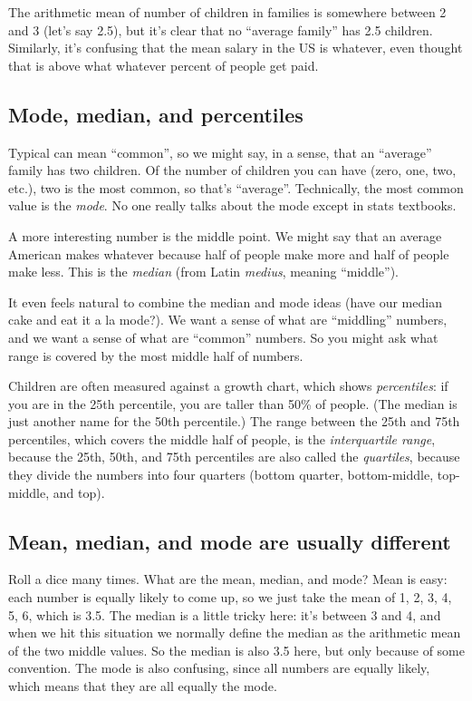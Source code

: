 The arithmetic mean of number of children in families is somewhere
between 2 and 3 (let's say 2.5), but it's clear that no ``average
family'' has 2.5 children. Similarly, it's confusing that the mean
salary in the US is whatever, even thought that is above what whatever
percent of people get paid.

\subsection{Mode, median, and
percentiles}\label{mode-median-and-percentiles}

Typical can mean ``common'', so we might say, in a sense, that an
``average'' family has two children. Of the number of children you can
have (zero, one, two, etc.), two is the most common, so that's
``average''. Technically, the most common value is the \emph{mode}. No
one really talks about the mode except in stats textbooks.

A more interesting number is the middle point. We might say that an
average American makes whatever because half of people make more and
half of people make less. This is the \emph{median} (from Latin
\emph{medius}, meaning ``middle'').

It even feels natural to combine the median and mode ideas (have our
median cake and eat it a la mode?). We want a sense of what are
``middling'' numbers, and we want a sense of what are ``common''
numbers. So you might ask what range is covered by the most middle half
of numbers.

Children are often measured against a growth chart, which shows
\emph{percentiles}: if you are in the 25th percentile, you are taller
than 50\% of people. (The median is just another name for the 50th
percentile.) The range between the 25th and 75th percentiles, which
covers the middle half of people, is the \emph{interquartile range},
because the 25th, 50th, and 75th percentiles are also called the
\emph{quartiles}, because they divide the numbers into four quarters
(bottom quarter, bottom-middle, top-middle, and top).

\subsection{Mean, median, and mode are usually
different}\label{mean-median-and-mode-are-usually-different}

Roll a dice many times. What are the mean, median, and mode? Mean is
easy: each number is equally likely to come up, so we just take the mean
of 1, 2, 3, 4, 5, 6, which is 3.5. The median is a little tricky here:
it's between 3 and 4, and when we hit this situation we normally define
the median as the arithmetic mean of the two middle values. So the
median is also 3.5 here, but only because of some convention. The mode
is also confusing, since all numbers are equally likely, which means
that they are all equally the mode.

